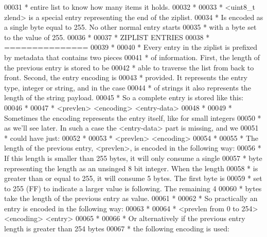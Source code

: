 \begin{DoxyCode}
00031 \textcolor{comment}{ * entire list to know how many items it holds.}
00032 \textcolor{comment}{ *}
00033 \textcolor{comment}{ * <uint8\_t zlend> is a special entry representing the end of the ziplist.}
00034 \textcolor{comment}{ * Is encoded as a single byte equal to 255. No other normal entry starts}
00035 \textcolor{comment}{ * with a byte set to the value of 255.}
00036 \textcolor{comment}{ *}
00037 \textcolor{comment}{ * ZIPLIST ENTRIES}
00038 \textcolor{comment}{ * ===============}
00039 \textcolor{comment}{ *}
00040 \textcolor{comment}{ * Every entry in the ziplist is prefixed by metadata that contains two pieces}
00041 \textcolor{comment}{ * of information. First, the length of the previous entry is stored to be}
00042 \textcolor{comment}{ * able to traverse the list from back to front. Second, the entry encoding is}
00043 \textcolor{comment}{ * provided. It represents the entry type, integer or string, and in the case}
00044 \textcolor{comment}{ * of strings it also represents the length of the string payload.}
00045 \textcolor{comment}{ * So a complete entry is stored like this:}
00046 \textcolor{comment}{ *}
00047 \textcolor{comment}{ * <prevlen> <encoding> <entry-data>}
00048 \textcolor{comment}{ *}
00049 \textcolor{comment}{ * Sometimes the encoding represents the entry itself, like for small integers}
00050 \textcolor{comment}{ * as we'll see later. In such a case the <entry-data> part is missing, and we}
00051 \textcolor{comment}{ * could have just:}
00052 \textcolor{comment}{ *}
00053 \textcolor{comment}{ * <prevlen> <encoding>}
00054 \textcolor{comment}{ *}
00055 \textcolor{comment}{ * The length of the previous entry, <prevlen>, is encoded in the following way:}
00056 \textcolor{comment}{ * If this length is smaller than 255 bytes, it will only consume a single}
00057 \textcolor{comment}{ * byte representing the length as an unsinged 8 bit integer. When the length}
00058 \textcolor{comment}{ * is greater than or equal to 255, it will consume 5 bytes. The first byte is}
00059 \textcolor{comment}{ * set to 255 (FF) to indicate a larger value is following. The remaining 4}
00060 \textcolor{comment}{ * bytes take the length of the previous entry as value.}
00061 \textcolor{comment}{ *}
00062 \textcolor{comment}{ * So practically an entry is encoded in the following way:}
00063 \textcolor{comment}{ *}
00064 \textcolor{comment}{ * <prevlen from 0 to 254> <encoding> <entry>}
00065 \textcolor{comment}{ *}
00066 \textcolor{comment}{ * Or alternatively if the previous entry length is greater than 254 bytes}
00067 \textcolor{comment}{ * the following encoding is used:}

\end{DoxyCode}
